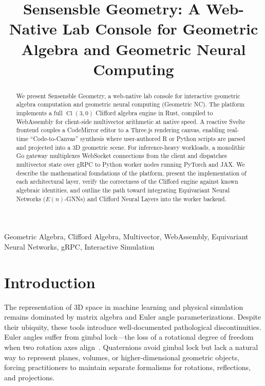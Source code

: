\documentclass[conference]{IEEEtran}
\begin{document}
\title{Sensensble Geometry: A Web-Native Lab Console for Geometric Algebra and Geometric Neural Computing}

\author{}

\maketitle

\begin{abstract}
We present Sensensble Geometry, a web-native lab console for interactive geometric algebra computation and geometric neural computing (Geometric NC). The platform implements a full $\operatorname{Cl}(3,0)$ Clifford algebra engine in Rust, compiled to WebAssembly for client-side multivector arithmetic at native speed. A reactive Svelte frontend couples a CodeMirror editor to a Three.js rendering canvas, enabling real-time ``Code-to-Canvas'' synthesis where user-authored R or Python scripts are parsed and projected into a 3D geometric scene. For inference-heavy workloads, a monolithic Go gateway multiplexes WebSocket connections from the client and dispatches multivector state over gRPC to Python worker nodes running PyTorch and JAX. We describe the mathematical foundations of the platform, present the implementation of each architectural layer, verify the correctness of the Clifford engine against known algebraic identities, and outline the path toward integrating Equivariant Neural Networks ($E(n)$-GNNs) and Clifford Neural Layers into the worker backend.
\end{abstract}

\begin{IEEEkeywords}
Geometric Algebra, Clifford Algebra, Multivector, WebAssembly, Equivariant Neural Networks, gRPC, Interactive Simulation
\end{IEEEkeywords}

\section{Introduction}

The representation of 3D space in machine learning and physical simulation remains dominated by matrix algebra and Euler angle parameterizations. Despite their ubiquity, these tools introduce well-documented pathological discontinuities. Euler angles suffer from gimbal lock---the loss of a rotational degree of freedom when two rotation axes align~\cite{b_diebel}. Quaternions avoid gimbal lock but lack a natural way to represent planes, volumes, or higher-dimensional geometric objects, forcing practitioners to maintain separate formalisms for rotations, reflections, and projections.
\end{document}
